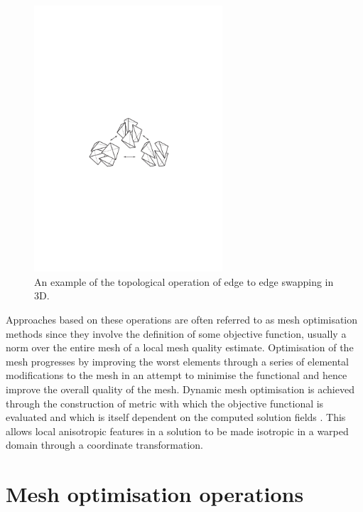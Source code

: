 \begin{figure}
\centering
\noindent\includegraphics[width=7cm]{images/edge2edge}
\caption{An example of the topological operation of edge to edge
  swapping in 3D.}
\label{Fig:edge2edge}
\end{figure}

Approaches based on these operations are often referred to as mesh
optimisation methods since they involve the definition of some
objective function, usually a norm over the entire mesh of a local
mesh quality estimate. Optimisation of the mesh progresses by
improving the worst elements through a series of elemental
modifications to the mesh in an attempt to minimise the functional and
hence improve the overall quality of the mesh. Dynamic mesh
optimisation is achieved through the construction of metric with which
the objective functional is evaluated and which is itself dependent on
the computed solution fields \citep{simpson1994, buscaglia1997,
  pain2001, piggott2005, power2006}. This allows local anisotropic
features in a solution to be made isotropic in a warped domain through
a coordinate transformation.

\section{Mesh optimisation operations}


